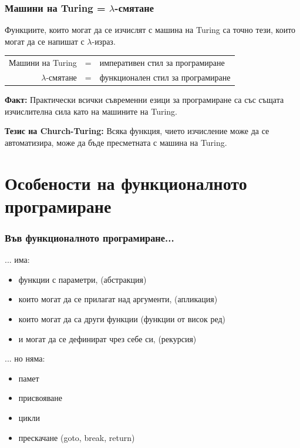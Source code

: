 \documentclass{beamer}
\begin{document}
\begin{frame}
  \frametitle{Машини на Turing = $\lambda$-смятане}

  \begin{theorem}
  Функциите, които могат да се изчислят с машина на Turing са точно тези, които могат да се напишат с $\lambda$-израз.
  \end{theorem}

  \pause

  \begin{center}
    \begin{tabular}{|rcl|}
      \hline
      Машини на Turing & = & императивен стил за програмиране\\
      $\lambda$-смятане & = & функционален стил за програмиране\\
      \hline
    \end{tabular}
  \end{center}

  \pause

  \textbf{Факт: }Практически всички съвременни езици за програмиране са със същата изчислителна сила като на машините на Turing.
  \vspace{1em}

  \pause

  \textbf{Тезис на Church-Turing:} Всяка функция, чието изчисление може да се автоматизира, може да бъде пресметната с машина на Turing.

\end{frame}

\section*{Особености на функционалното програмиране}

\begin{frame}
  \frametitle{Във функционалното програмиране...}

  ... има:
  \begin{itemize}[<+->]
  \item функции с параметри, (абстракция)
  \item които могат да се прилагат над аргументи, (апликация)
  \item които могат да са други функции (функции от висок ред)
  \item и могат да се дефинират чрез себе си, (рекурсия)
  \end{itemize}
  \onslide<+->
  ... но няма:
  \begin{itemize}[<+->]
  \item памет
  \item присвояване
  \item цикли
  \item прескачане (goto, break, return)
  \end{itemize}
\end{frame}
\end{document}
